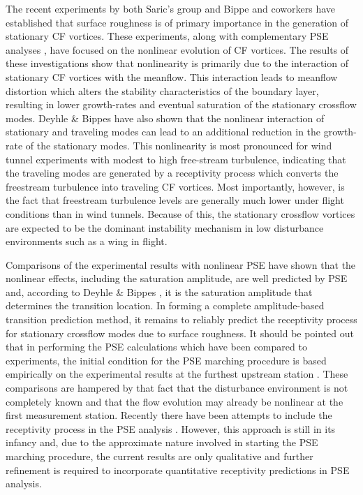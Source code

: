 The recent experiments by both Saric's group \cite{ReSaCaCh:96} and Bippe and
coworkers \cite{DeBi:96} have established that surface roughness is of primary
importance in the generation of stationary CF vortices.  These experiments,
along with complementary PSE analyses \cite{MaLiCh:94,HaRe:96}, have focused
on the nonlinear evolution of CF vortices.  The results of these
investigations show that nonlinearity is primarily due to the interaction of
stationary CF vortices with the meanflow.  This interaction leads to meanflow
distortion which alters the stability characteristics of the boundary layer,
resulting in lower growth-rates and eventual saturation of the stationary
crossflow modes.
%
%
Deyhle \& Bippes \cite{DeBi:96} have also shown that the nonlinear interaction
of stationary and traveling modes can lead to an additional reduction in the
growth-rate of the stationary modes.  This nonlinearity is most pronounced for
wind tunnel experiments with modest to high free-stream turbulence, indicating
that the traveling modes are generated by a receptivity process which converts
the freestream turbulence into traveling CF vortices.
%
%
Most importantly, however, is the fact that freestream turbulence levels are
generally much lower under flight conditions than in wind tunnels.  Because of
this, the stationary crossflow vortices are expected to be the dominant
instability mechanism in low disturbance environments such as a wing in
flight.

Comparisons of the experimental results \cite{ReSaCaCh:96,DeBi:96} with
nonlinear PSE \cite{HaRe:96,MaLiCh:94} have shown that the nonlinear effects,
including the saturation amplitude, are well predicted by PSE and, according
to Deyhle \& Bippes \cite{DeBi:96}, it is the saturation amplitude that
determines the transition location.  In forming a complete amplitude-based
transition prediction method, it remains to reliably predict the receptivity
process for stationary crossflow modes due to surface roughness.  It should be
pointed out that in performing the PSE calculations which have been compared
to experiments, the initial condition for the PSE marching procedure is based
empirically on the experimental results at the furthest upstream station
\cite{HaRe:96}.  These comparisons are hampered by that fact that the
disturbance environment is not completely known and that the flow evolution
may already be nonlinear at the first measurement station.  Recently there
have been attempts to include the receptivity process in the PSE analysis
\cite{HeLi:93}.  However, this approach is still in its infancy and, due to
the approximate nature involved in starting the PSE marching procedure, the
current results are only qualitative and further refinement is required to
incorporate quantitative receptivity predictions in PSE analysis.

